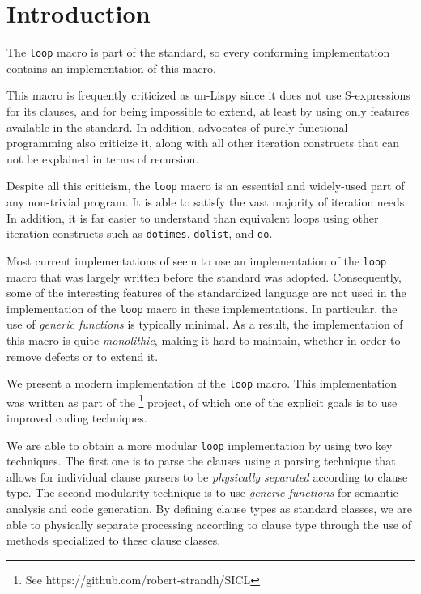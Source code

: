 \section{Introduction}
\label{sec-introduction}

The \texttt{loop} macro is part of the \commonlisp{} standard, so
every conforming \commonlisp{} implementation contains an
implementation of this macro. 

This macro is frequently criticized as un-Lispy since it does not use
S-expressions for its clauses, and for being impossible to extend, at
least by using only features available in the \commonlisp{} standard.
In addition, advocates of purely-functional programming also criticize
it, along with all other iteration constructs that can not be
explained in terms of recursion.

Despite all this criticism, the \texttt{loop} macro is an essential
and widely-used part of any non-trivial \commonlisp{} program.  It is
able to satisfy the vast majority of iteration needs.  In addition, it
is far easier to understand than equivalent loops using other
iteration constructs such as \texttt{dotimes}, \texttt{dolist}, and
\texttt{do}.

Most current implementations of \commonlisp{} seem to use an
implementation of the \texttt{loop} macro that was largely written
before the \commonlisp{} standard was adopted.  Consequently, some of
the interesting features of the standardized \commonlisp{} language
are not used in the implementation of the \texttt{loop} macro in
these implementations.  In particular, the use of \emph{generic
  functions} is typically minimal.  As a result, the implementation of
this macro is quite \emph{monolithic}, making it hard to maintain,
whether in order to remove defects or to extend it.

We present a modern implementation of the \texttt{loop} macro.  This
implementation was written as part of the \sicl{}%
\footnote{See https://github.com/robert-strandh/SICL} project, of
which one of the explicit goals is to use improved coding techniques.

We are able to obtain a more modular \texttt{loop} implementation by
using two key techniques.  The first one is to parse the clauses using
a parsing technique that allows for individual clause parsers to be
\emph{physically separated} according to clause type.  The second
modularity technique is to use \emph{generic functions} for semantic
analysis and code generation.  By defining clause types as standard
classes, we are able to physically separate processing according to
clause type through the use of methods specialized to these clause
classes.
